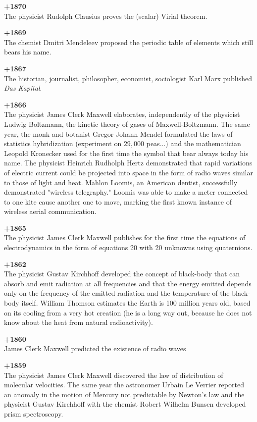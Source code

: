 \textbf{+1870}\\
The physicist Rudolph Clausius proves the (scalar) Virial theorem.

\textbf{+1869}\\
The chemist Dmitri Mendeleev proposed the periodic table of elements which still bears his name.

\textbf{+1867}\\
The historian, journalist, philosopher, economist, sociologist Karl Marx published \textit{Das Kapital}. 

\textbf{+1866}\\
The physicist James Clerk Maxwell elaborates, independently of the physicist Ludwig Boltzmann, the kinetic theory of gases of Maxwell-Boltzmann. The same year, the monk and botanist Gregor Johann Mendel formulated the laws of statistics hybridization (experiment on $29,000$ peas...) and the mathematician Leopold Kronecker used for the first time the symbol that bear always today his name. The physicist Heinrich Rudholph Hertz demonstrated that rapid variations of electric current could be projected into space in the form of radio waves similar to those of light and heat. Mahlon Loomis, an American dentist, successfully demonstrated "wireless telegraphy." Loomis was able to make a meter connected to one kite cause another one to move, marking the first known instance of wireless aerial communication.

\textbf{+1865}\\
The physicist James Clerk Maxwell publishes for the first time the equations of electrodynamics in the form of equations 20 with 20 unknowns using quaternions. 

\textbf{+1862}\\
The physicist Gustav Kirchhoff developed the concept of black-body that can absorb and emit radiation at all frequencies and that the energy emitted depends only on the frequency of the emitted radiation and the temperature of the black-body itself. William Thomson estimates the Earth is 100 million years old, based on its cooling from a very hot creation (he is a long way out, because he does not know about the heat from natural radioactivity).

\textbf{+1860}\\
James Clerk Maxwell predicted the existence of radio waves

\textbf{+1859}\\
The physicist James Clerk Maxwell discovered the law of distribution of molecular velocities. The same year the astronomer Urbain Le Verrier reported an anomaly in the motion of Mercury not predictable by Newton's law and the physicist Gustav Kirchhoff with the chemist Robert Wilhelm Bunsen developed prism spectroscopy. 

